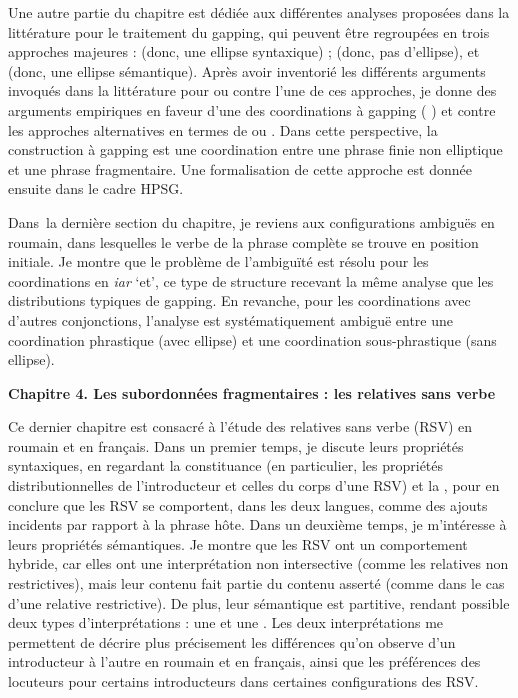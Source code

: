 Une autre partie du chapitre est dédiée aux différentes analyses proposées dans la littérature pour le traitement du gapping, qui peuvent être regroupées en trois approches majeures :  (donc, une ellipse syntaxique) ;  (donc, pas d’ellipse), et  (donc, une ellipse sémantique). Après avoir inventorié les différents arguments invoqués dans la littérature pour ou contre l’une de ces approches, je donne des arguments empiriques en faveur d’une  des coordinations à gapping ({\cad} ) et contre les approches alternatives en termes de  ou . Dans cette perspective, la construction à gapping est une coordination entre une phrase finie non elliptique et une phrase fragmentaire. Une formalisation de cette approche est donnée ensuite dans le cadre HPSG. 



Dans~la dernière section du chapitre, je reviens aux configurations ambiguës en roumain, dans lesquelles le verbe de la phrase complète se trouve en position initiale. Je montre que le problème de l’ambiguïté est résolu pour les coordinations en \textit{iar} ‘et’, ce type de structure recevant la même analyse que les distributions typiques de gapping. En revanche, pour les coordinations avec d’autres conjonctions, l’analyse est systématiquement ambiguë entre une coordination phrastique (avec ellipse) et une coordination sous-phrastique (sans ellipse). \newline 


\textbf{Chapitre 4. Les subordonnées fragmentaires : les relatives sans verbe}



Ce dernier chapitre est consacré à l’étude des relatives sans verbe (RSV) en roumain et en français. Dans un premier temps, je discute leurs propriétés syntaxiques, en regardant la constituance (en particulier, les propriétés distributionnelles de l’introducteur et celles du corps d’une RSV) et la , pour en conclure que les RSV se comportent, dans les deux langues, comme des ajouts incidents par rapport à la phrase hôte. Dans un deuxième temps, je m’intéresse à leurs propriétés sémantiques. Je montre que les RSV ont un comportement hybride, car elles ont une interprétation non intersective (comme les relatives non restrictives), mais leur contenu fait partie du contenu asserté (comme dans le cas d’une relative restrictive). De plus, leur sémantique est partitive, rendant possible deux types d’interprétations : une  et une . Les deux interprétations me permettent de décrire plus précisement les différences qu’on observe d’un introducteur à l’autre en roumain et en français, ainsi que les préférences des locuteurs pour certains introducteurs dans certaines configurations des RSV.


